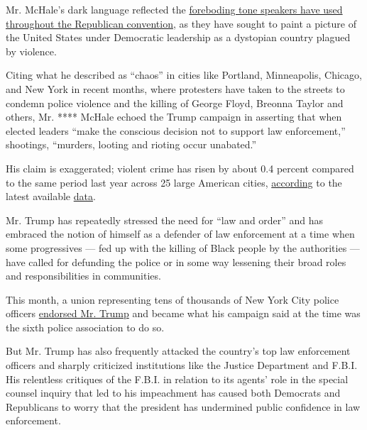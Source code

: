 Mr. McHale's dark language reflected the
\href{https://www.nytimes3xbfgragh.onion/2020/08/24/us/politics/republican-convention-recap.html}{foreboding
tone speakers have used throughout the Republican convention}, as they
have sought to paint a picture of the United States under Democratic
leadership as a dystopian country plagued by violence.

Citing what he described as ``chaos'' in cities like Portland,
Minneapolis, Chicago, and New York in recent months, where protesters
have taken to the streets to condemn police violence and the killing of
George Floyd, Breonna Taylor and others, Mr. **** McHale echoed the
Trump campaign in asserting that when elected leaders ``make the
conscious decision not to support law enforcement,'' shootings,
``murders, looting and rioting occur unabated.''

His claim is exaggerated; violent crime has risen by about 0.4 percent
compared to the same period last year across 25 large American cities,
\href{https://slack-redir.net/link?url=https\%3A\%2F\%2Fwww.nytimes3xbfgragh.onion\%2F2020\%2F07\%2F06\%2Fupshot\%2Fmurders-rising-crime-coronavirus.html}{according}
to the latest available
\href{https://slack-redir.net/link?url=https\%3A\%2F\%2Fdocs.google.com\%2Fspreadsheets\%2Fd\%2F1Z9b5mIwztAwmEHJW7Q5DHMjS14-Rs7XIXOt33Al_rDw\%2Fedit\%23gid\%3D1774879893}{data}.

Mr. Trump has repeatedly stressed the need for ``law and order'' and has
embraced the notion of himself as a defender of law enforcement at a
time when some progressives --- fed up with the killing of Black people
by the authorities --- have called for defunding the police or in some
way lessening their broad roles and responsibilities in communities.

This month, a union representing tens of thousands of New York City
police officers
\href{https://www.nytimes3xbfgragh.onion/2020/08/16/us/elections/a-new-york-police-union-endorses-trump.html}{endorsed
Mr. Trump} and became what his campaign said at the time was the sixth
police association to do so.

But Mr. Trump has also frequently attacked the country's top law
enforcement officers and sharply criticized institutions like the
Justice Department and F.B.I. His relentless critiques of the F.B.I. in
relation to its agents' role in the special counsel inquiry that led to
his impeachment has caused both Democrats and Republicans to worry that
the president has undermined public confidence in law enforcement.

